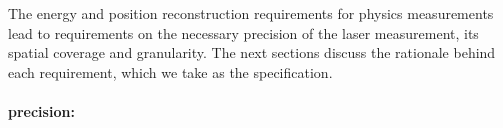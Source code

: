 




The energy and position reconstruction requirements for physics measurements lead to requirements on the necessary precision of the laser %
\efield measurement, its spatial coverage and granularity. The next sections discuss the rationale behind each requirement, which we take as the  specification.

\paragraph{\efield precision:}


